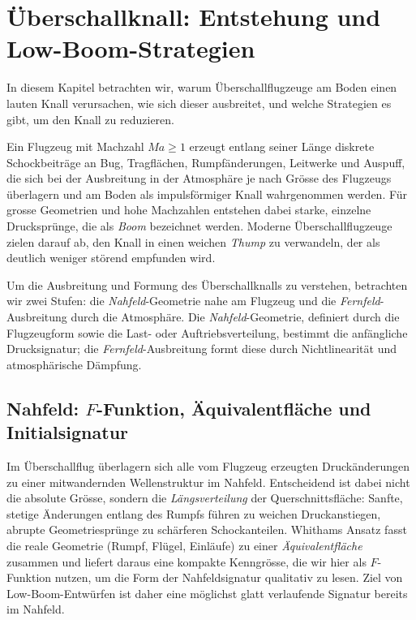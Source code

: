 \section{Überschallknall: Entstehung und Low-Boom-Strategien
\label{schall:section:boom}}

In diesem Kapitel betrachten wir, warum Überschallflugzeuge am Boden
einen lauten Knall verursachen, wie sich dieser ausbreitet, und welche
Strategien es gibt, um den Knall zu reduzieren.

Ein Flugzeug mit Machzahl $\textit{Ma}\ge1$ erzeugt entlang seiner Länge diskrete
Schockbeiträge an Bug, Tragflächen, Rumpfänderungen, Leitwerke und Auspuff,
die sich bei der Ausbreitung in der Atmosphäre je nach Grösse des Flugzeugs
überlagern und am Boden als impulsförmiger Knall wahrgenommen werden.
Für grosse Geometrien und hohe Machzahlen entstehen dabei
starke, einzelne Drucksprünge, die als \emph{Boom} bezeichnet werden.
Moderne Überschallflugzeuge zielen darauf ab, den Knall in einen
weichen \emph{Thump} zu verwandeln, der als deutlich weniger störend
empfunden wird.

Um die Ausbreitung und Formung des Überschallknalls zu verstehen, betrachten wir
zwei Stufen: die \emph{Nahfeld}-Geometrie nahe am Flugzeug und die \emph{Fernfeld}-Ausbreitung
durch die Atmosphäre.
Die \emph{Nahfeld}-Geometrie, definiert durch die Flugzeugform sowie die  Last- oder
Auftriebsverteilung, bestimmt die anfängliche Drucksignatur;
die \emph{Fernfeld}-Ausbreitung formt diese durch Nichtlinearität und atmosphärische Dämpfung.

\subsection{Nahfeld: $F$-Funktion, Äquivalentfläche und Initialsignatur}
Im Überschallflug überlagern sich alle vom Flugzeug erzeugten
Druckänderungen zu einer mitwandernden Wellenstruktur im Nahfeld.
Entscheidend ist dabei nicht die absolute Grösse, sondern die
\emph{Längsverteilung} der Querschnittsfläche:
Sanfte, stetige Änderungen entlang des Rumpfs führen zu weichen
Druckanstiegen, abrupte Geometriesprünge zu schärferen Schockanteilen.
Whithams Ansatz fasst die reale Geometrie (Rumpf, Flügel, Einläufe) zu
einer \emph{Äquivalentfläche} zusammen und liefert daraus eine kompakte
Kenngrösse, die wir hier als \(F\)-Funktion nutzen, um
die Form der Nahfeldsignatur qualitativ zu lesen.
Ziel von Low-Boom-Entwürfen ist daher eine möglichst glatt
verlaufende Signatur bereits im Nahfeld.

